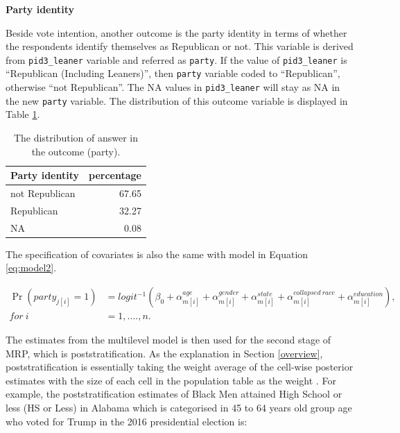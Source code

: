 \documentclass{monashthesis}
\begin{document}
\textbf{Party identity}

Beside vote intention, another outcome is the party identity in terms of whether the respondents identify themselves as Republican or not. This variable is derived from \texttt{pid3\_leaner} variable and referred as \texttt{party}. If the value of \texttt{pid3\_leaner} is ``Republican (Including Leaners)'', then \texttt{party} variable coded to ``Republican'', otherwise ``not Republican''. The NA values in \texttt{pid3\_leaner} will stay as NA in the new \texttt{party} variable. The distribution of this outcome variable is displayed in Table \ref{tab:party-dist}.

\begin{table}

\caption{\label{tab:party-dist}The distribution of answer in the outcome (party).}
\centering
\begin{tabular}[t]{lr}
\toprule
Party identity & percentage\\
\midrule
not Republican & 67.65\\
Republican & 32.27\\
NA & 0.08\\
\bottomrule
\end{tabular}
\end{table}

The specification of covariates is also the same with model in Equation \eqref{eq:model2}.

\begin{equation} 
\begin{split}
\Pr(party_{j[i]} = 1) &= logit^{-1}\left(\beta_0 + \alpha^{age}_{m[i]} + \alpha^{gender}_{m[i]} + \alpha^{state}_{m[i]} + \alpha^{collapsed\ race}_{m[i]} + \alpha^{education}_{m[i]}\right), \\
for\ i &= 1, ...., n.
\end{split}
\label{eq:model4b}
\end{equation}

The estimates from the multilevel model is then used for the second stage of MRP, which is poststratification. As the explanation in Section \ref{overview}, poststratification is essentially taking the weight average of the cell-wise posterior estimates with the size of each cell in the population table as the weight \autocite{GaoYuxiang2021IMRa}. For example, the poststratification estimates of Black Men attained High School or less (HS or Less) in Alabama which is categorised in 45 to 64 years old group age who voted for Trump in the 2016 presidential election is:
\end{document}
